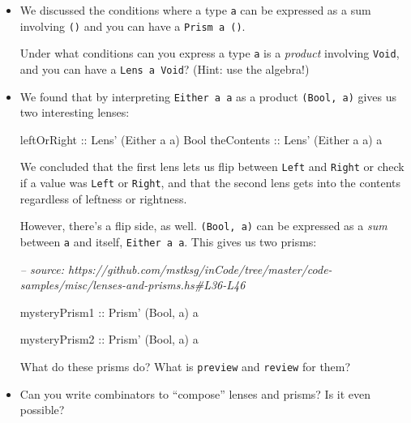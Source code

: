 \documentclass[]{article}
\newenvironment{Shaded}{}{}
\newcommand{\CommentTok}[1]{\textcolor[rgb]{0.38,0.63,0.69}{\textit{#1}}}
\newcommand{\DataTypeTok}[1]{\textcolor[rgb]{0.56,0.13,0.00}{#1}}
\newcommand{\NormalTok}[1]{#1}
\newcommand{\OtherTok}[1]{\textcolor[rgb]{0.00,0.44,0.13}{#1}}
\begin{document}
\begin{itemize}
\item
  We discussed the conditions where a type \texttt{a} can be expressed as a sum
  involving \texttt{()} and you can have a
  \texttt{Prism\textquotesingle{}\ a\ ()}.

  Under what conditions can you express a type \texttt{a} is a \emph{product}
  involving \texttt{Void}, and you can have a
  \texttt{Lens\textquotesingle{}\ a\ Void}? (Hint: use the algebra!)
\item
  We found that by interpreting \texttt{Either\ a\ a} as a product
  \texttt{(Bool,\ a)} gives us two interesting lenses:

\begin{Shaded}
\begin{Highlighting}[]
\OtherTok{leftOrRight ::} \DataTypeTok{Lens'}\NormalTok{ (}\DataTypeTok{Either}\NormalTok{ a a) }\DataTypeTok{Bool}
\OtherTok{theContents ::} \DataTypeTok{Lens'}\NormalTok{ (}\DataTypeTok{Either}\NormalTok{ a a) a}
\end{Highlighting}
\end{Shaded}

  We concluded that the first lens lets us flip between \texttt{Left} and
  \texttt{Right} or check if a value was \texttt{Left} or \texttt{Right}, and
  that the second lens gets into the contents regardless of leftness or
  rightness.

  However, there's a flip side, as well. \texttt{(Bool,\ a)} can be expressed as
  a \emph{sum} between \texttt{a} and itself, \texttt{Either\ a\ a}. This gives
  us two prisms:

\begin{Shaded}
\begin{Highlighting}[]
\CommentTok{-- source: https://github.com/mstksg/inCode/tree/master/code-samples/misc/lenses-and-prisms.hs#L36-L46}

\OtherTok{mysteryPrism1 ::} \DataTypeTok{Prism'}\NormalTok{ (}\DataTypeTok{Bool}\NormalTok{, a) a}

\OtherTok{mysteryPrism2 ::} \DataTypeTok{Prism'}\NormalTok{ (}\DataTypeTok{Bool}\NormalTok{, a) a}
\end{Highlighting}
\end{Shaded}

  What do these prisms do? What is \texttt{preview} and \texttt{review} for
  them?
\item
  Can you write combinators to ``compose'' lenses and prisms? Is it even
  possible?


\end{itemize}
\end{document}
